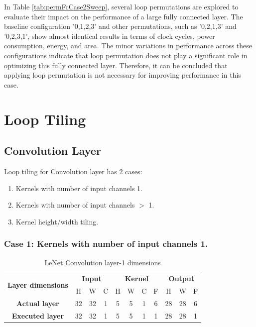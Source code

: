 In Table \ref{tab:permFcCase2Sweep}, several loop permutations are explored to evaluate their impact on the performance of a large fully connected layer. The baseline configuration '0,1,2,3' and other permutations, such as '0,2,1,3' and '0,2,3,1', show almost identical results in terms of clock cycles, power consumption, energy, and area. The minor variations in performance across these configurations indicate that loop permutation does not play a significant role in optimizing this fully connected layer. Therefore, it can be concluded that applying loop permutation is not necessary for improving performance in this case.

\clearpage
\section{Loop Tiling}
\subsection{Convolution Layer}

Loop tiling for Convolution layer has 2 cases:
\begin{enumerate}
 \item Kernels with number of input channels 1.
 \item Kernels with number of input channels $>$ 1.
 \item Kernel height/width tiling.
\end{enumerate}

\subsubsection{Case 1: Kernels with number of input channels 1.}


\begin{table}[H]
\centering
\caption{LeNet Convolution layer-1 dimensions}
\label{tab:tileConvolutionCase1Dim}
 \begin{tabular}{|c|c|c|c|c|c|c|c|c|c|c|} \hline  
 
 \multirow{2}{*}{\textbf{Layer dimensions}} &  
 \multicolumn{3}{|c|}{\textbf{Input}} &  
 \multicolumn{4}{|c|}{\textbf{Kernel}} &  
 \multicolumn{3}{|c|}{\textbf{Output}}\\ \cline{2-11}
 & H &  W &  C&  H &  W &  C &  F &  H &  W & F\\ \hline  
 \textbf{Actual layer} &  32 &  32 & 1 & 5 & 5 & 1 & 6 & 28 & 28 & 6\\ \hline 
 \textbf{Executed layer} &  32 & 32 &  \cellcolor{yellow}1 & 5 & 5 & 1 & \cellcolor{yellow}1 & 28 & 28 & \cellcolor{yellow}1 \\ \hline 
 \end{tabular}
\end{table}

